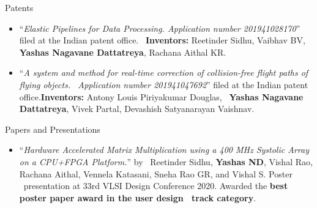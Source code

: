 \documentclass{CV} %
\begin{document}


\begin{rSection}{Patents}

  \begin{itemize}

  \item ``\textit{Elastic Pipelines for Data Processing. Application number 201941028170}'' filed at the Indian patent office. \
    \newline \textbf{Inventors:} Reetinder Sidhu, Vaibhav BV, \textbf{Yashas Nagavane Dattatreya}, Rachana Aithal KR.

  \item ``\textit{A system and method for real-time correction of collision-free flight paths of flying objects. \
    Application number 201941047692}'' filed at the Indian patent office.\newline \textbf{Inventors:} Antony Louis Piriyakumar Douglas, \
    \textbf{Yashas Nagavane Dattatreya}, Vivek Partal, Devashish Satyanarayan Vaishnav.
    
  \end{itemize}
  
\end{rSection}




\begin{rSection}{Papers and Presentations}

  \begin{itemize}

  \item ``\textit{Hardware Accelerated Matrix Multiplication using a 400 MHz Systolic Array on a CPU+FPGA Platform.}'' by \
    Reetinder Sidhu, \textbf{Yashas ND}, Vishal Rao, Rachana Aithal, Vennela Katasani, Sneha Rao GR, and Vishal S. Poster \
    presentation at 33rd VLSI Design Conference 2020. Awarded the \textbf{best poster paper award in the user design \
    track category}.
    
  \end{itemize}
  
\end{rSection}
\end{document}
